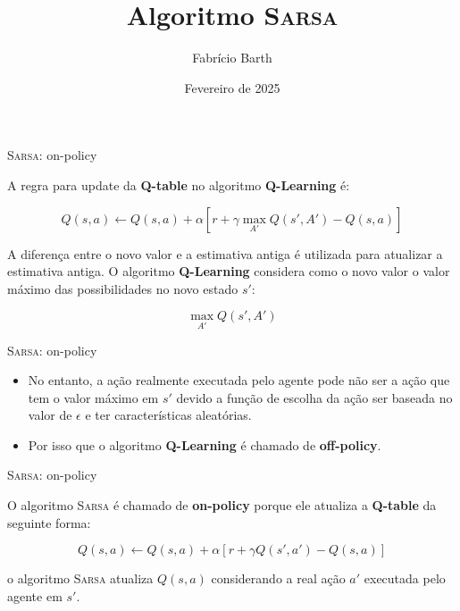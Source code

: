 \documentclass{beamer}
\begin{document}
\title{Algoritmo \textsc{Sarsa}} 
\author{Fabrício Barth}
\date{Fevereiro de 2025}

\maketitle

\begin{frame}{\textsc{Sarsa}: on-policy}
	
	A regra para update da \textbf{Q-table} no algoritmo \textbf{Q-Learning} é: 
	
	\begin{equation}
	Q(s,a) \leftarrow Q(s,a) + \alpha [r +\gamma \max_{A'}{Q(s', A')} - Q(s,a)]
	\end{equation}

	A diferença entre o novo valor e a estimativa antiga é utilizada para atualizar a estimativa antiga. O algoritmo \textbf{Q-Learning} considera como o novo valor o valor máximo das possibilidades no novo estado $s'$: 
	
	\begin{equation}
	\max_{A'}{Q(s', A')}
	\end{equation}
	
\end{frame}


\begin{frame}{\textsc{Sarsa}: on-policy}
	
	\begin{itemize}
		
	\item No entanto, a ação realmente executada pelo agente pode não ser a ação que tem o valor máximo em $s'$ devido a função de escolha da ação ser baseada no valor de $\epsilon$ e ter características aleatórias.
	
	\item Por isso que o algoritmo \textbf{Q-Learning} é chamado de \textbf{off-policy}.   
\end{itemize}
	
\end{frame}


\begin{frame}{\textsc{Sarsa}: on-policy}
	
	O algoritmo \textsc{Sarsa} é chamado de  \textbf{on-policy} porque ele atualiza a \textbf{Q-table} da seguinte forma: 
	
	\begin{equation}
		Q(s,a) \leftarrow Q(s,a) + \alpha [r +\gamma Q(s', a') - Q(s,a)]
	\end{equation}
	
	o algoritmo \textsc{Sarsa} atualiza $Q(s,a)$ considerando a real ação $a'$ executada pelo agente em $s'$.
	
\end{frame}
\end{document}
